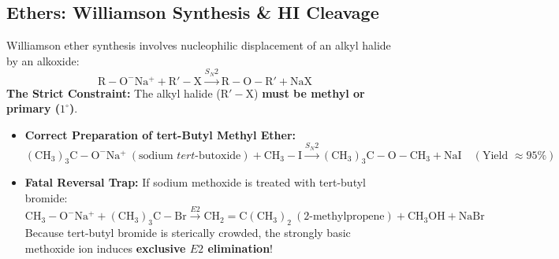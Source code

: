 \documentclass[10pt,a4paper]{article}
\begin{document}
\subsection{Ethers: Williamson Synthesis \& HI Cleavage}

\begin{trapbox}
Williamson ether synthesis involves nucleophilic displacement of an alkyl halide by an alkoxide:
\begin{equation}
  \mathrm{R-O^-Na^+} + \mathrm{R'-X} \xrightarrow{S_N2} \mathrm{R-O-R'} + \mathrm{NaX}
\end{equation}
\textbf{The Strict Constraint:} The alkyl halide ($\mathrm{R'-X}$) \textbf{must be methyl or primary ($1^\circ$)}.
\begin{itemize}
  \item \textbf{Correct Preparation of tert-Butyl Methyl Ether:}
  \begin{equation}
    \mathrm{(CH_3)_3C-O^-Na^+} \ (\text{sodium } tert\text{-butoxide}) + \mathrm{CH_3-I} \xrightarrow{S_N2} \mathbf{\mathrm{(CH_3)_3C-O-CH_3}} + \mathrm{NaI} \quad (\text{Yield } \approx 95\%)
  \end{equation}
  \item \textbf{Fatal Reversal Trap:} If sodium methoxide is treated with tert-butyl bromide:
  \begin{equation}
    \mathrm{CH_3-O^-Na^+} + \mathrm{(CH_3)_3C-Br} \xrightarrow{E2} \mathbf{\mathrm{CH_2=C(CH_3)_2}} \ (\text{2-methylpropene}) + \mathrm{CH_3OH} + \mathrm{NaBr}
  \end{equation}
  Because tert-butyl bromide is sterically crowded, the strongly basic methoxide ion induces \textbf{exclusive $E2$ elimination}!
\end{itemize}
\end{trapbox}
\end{document}
